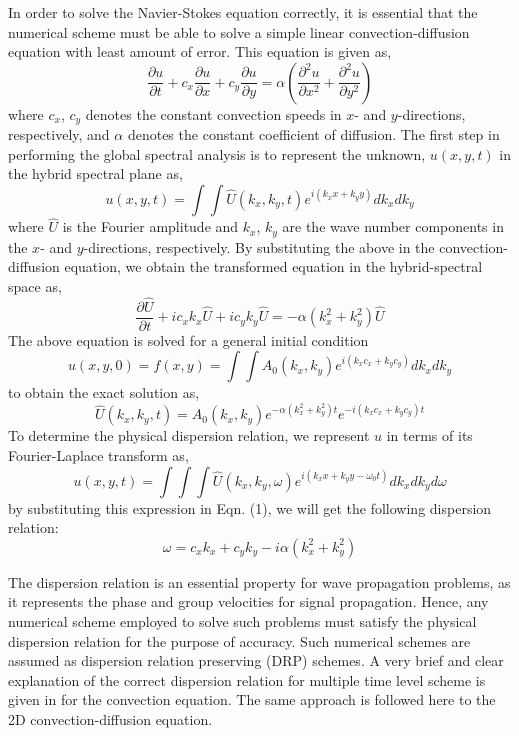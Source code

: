 \documentclass[showpacs,preprintnumbers,amsmath,amssymb]{revtex4-1} %
\begin{document}
In order to solve the Navier-Stokes equation correctly, it is essential that the numerical scheme must be able to solve a simple linear convection-diffusion equation with least amount of error. This equation is given as,
\begin{equation}
\frac{\partial u}{\partial t}+c_x\frac{\partial u}{\partial x}+c_y\frac{\partial u}{\partial y}=\alpha \left(\frac{\partial^2 u}{\partial x^2}+\frac{\partial^2 u}{\partial y^2}\right)
\end{equation}
where $c_x$, $c_y$ denotes the constant convection speeds in $x$- and $y$-directions, respectively, and $\alpha$ denotes the constant coefficient of diffusion. The first step in performing the global spectral analysis is to represent the unknown, $u(x,y,t)$ in the hybrid spectral plane as,
\begin{equation}
u(x,y,t)= \int\int \hat{U}(k_x,k_y,t)e^{i(k_xx+k_yy)} dk_x dk_y
\end{equation}
where $\hat{U}$ is the Fourier amplitude and $k_x$, $k_y$ are the wave number components in the $x$- and $y$-directions, respectively. By substituting the above in the convection-diffusion equation, we obtain the transformed equation in the hybrid-spectral space as,
\begin{equation}
\frac{\partial \hat{U}}{\partial t}+ic_xk_x\hat{U}+ic_yk_y\hat{U}=-\alpha(k_x^2+k_y^2)\hat{U}
\end{equation}
The above equation is solved for a general initial condition
\begin{equation}
u(x,y,0)=f(x,y)=\int\int A_0(k_x,k_y) e^{i(k_xc_x+k_yc_y)} dk_x dk_y
\end{equation}
to obtain the exact solution as,
\begin{equation}
\hat{U}(k_x,k_y,t)=A_0(k_x,k_y)e^{-\alpha(k_x^2+k_y^2)t}e^{-i(k_xc_x+k_yc_y)t}
\end{equation}
To determine the physical dispersion relation, we represent $u$ in terms of its Fourier-Laplace transform as,
\begin{equation}
u(x,y,t)=\int\int\int \hat{U}(k_x,k_y,\omega)e^{i(k_xx+k_yy-\omega_0t)} dk_x dk_y d\omega
\end{equation}
by substituting this expression in Eqn. (1), we will get the following dispersion relation: 
\begin{equation}
\omega=c_xk_x+c_yk_y-i\alpha(k_x^2+k_y^2)
\end{equation}

The dispersion relation is an essential property for wave propagation problems, as it represents the phase and group velocities for signal propagation. Hence, any numerical scheme employed to solve such problems must satisfy the physical dispersion relation for the purpose of accuracy. Such numerical schemes are assumed as dispersion relation preserving (DRP) schemes. A very brief and clear explanation of the correct dispersion relation for multiple time level scheme is given in \cite{SENGUPTA_et_al_3} for the convection equation. The same approach is followed here to the 2D convection-diffusion equation.
\end{document}
